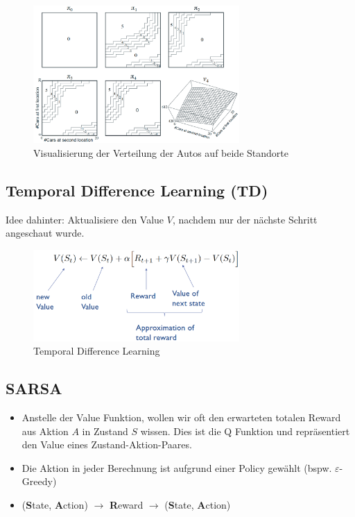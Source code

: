 \documentclass[a4paper]{article}
\begin{document}
		\begin{figure}[htb!]
			\centering
			\includegraphics[width=0.7\textwidth]{img/08_reinforcement_learning/car_rental.png}
			\caption{Visualisierung der Verteilung der Autos auf beide Standorte}
		\end{figure}

		\subsection{Temporal Difference Learning (TD)}
		
		Idee dahinter: Aktualisiere den Value $V$, nachdem nur der nächste Schritt angeschaut wurde.
		
		\begin{figure}[htb!]
			\centering
			\includegraphics[width=0.7\textwidth]{img/08_reinforcement_learning/td.png}
			\caption{Temporal Difference Learning}
		\end{figure}
	
		\newpage
	
		\subsection{SARSA}
		
		\begin{itemize}
			\item Anstelle der Value Funktion, wollen wir oft den erwarteten totalen Reward aus Aktion $A$ in Zustand $S$ wissen.
				Dies ist die Q Funktion und repräsentiert den Value eines Zustand-Aktion-Paares.
			\item Die Aktion in jeder Berechnung ist aufgrund einer Policy gewählt (bspw. $\varepsilon$-Greedy)
			\item (\textbf{S}tate, \textbf{A}ction) $\rightarrow$ \textbf{R}eward $\rightarrow$ (\textbf{S}tate, \textbf{A}ction)
		\end{itemize}
	
\end{document}
